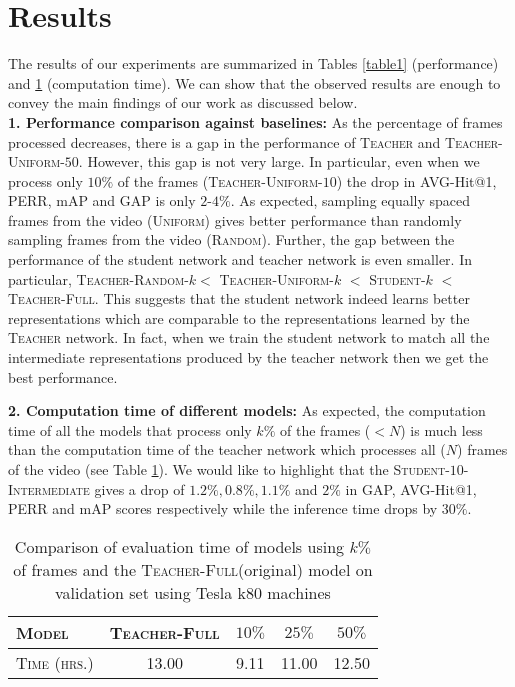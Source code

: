 \documentclass[10pt,twocolumn,letterpaper]{article}
\newcommand{\tea}{\textsc{Teacher}\xspace}
\newcommand{\stud}{\textsc{Student}\xspace}
\newcommand{\full}{\textsc{Teacher-Full}}
\newcommand{\uniform}[1]{\textsc{Teacher-Uniform-}$#1$}
\newcommand{\random}[1]{\textsc{Teacher-Random-}$#1$}
\newcommand{\inter}[1]{\textsc{Student-}$#1$\textsc{-Intermediate}}
\begin{document}
\section{Results} 
The results of our experiments are summarized in Tables \ref{table1} (performance) and \ref{table2} (computation time). We can show that the observed results are enough to convey the main findings of our work as discussed below. \\
\noindent\textbf{1. Performance comparison against baselines:} As the percentage of frames processed decreases, there is a gap in the performance of \tea and \uniform{50}. However, this gap is not very large. In particular, even when we process only $10\%$ of the frames (\uniform{10}) the drop in AVG-Hit@1, PERR, mAP and GAP is only $2$-$4\%$. As expected, sampling equally spaced frames from the video (\textsc{Uniform}) gives better performance than randomly sampling frames from the video (\textsc{Random}). Further, the gap between the performance of the student network and teacher network is even smaller. In particular, \random{k}$<$ \uniform{k} $<$ \stud-$k$ $<$ \full. This suggests that the student network indeed learns better representations which are comparable to the representations learned by the \tea network. In fact, when we train the student network to match all the intermediate representations produced by the teacher network then we get the best performance. 

\noindent\textbf{2. Computation time of different models:} 
As expected, the computation time of all the models that process only $k \%$ of the frames ($<N$) is much less than the computation time of the teacher network which processes all ($N$) frames of the video (see Table \ref{table2}). We would like to highlight that the \inter{10} gives a drop of $1.2 \%, 0.8 \%, 1.1\%$ and $2 \%$ in GAP, AVG-Hit@1, PERR and mAP scores respectively while the inference time drops by $30\%$.

\vspace*{-4mm}
\begin{table}
\centering
\begin{tabular}{@{}lcccc@{}}
\toprule
\textsc{Model}    & \full & $10\%$ &  $25\% $  & $50\% $     \\
\midrule
\textsc{Time (hrs.)}&  13.00  &  9.11 &  11.00 &   12.50 \\
\bottomrule
\end{tabular}
\vspace*{-3mm}
\caption{Comparison of evaluation time of models using $k\%$ of frames and the \full (original) model  on validation set using Tesla k80 machines}
\label{table2}
\vspace*{-4mm}
\end{table}
\end{document}
